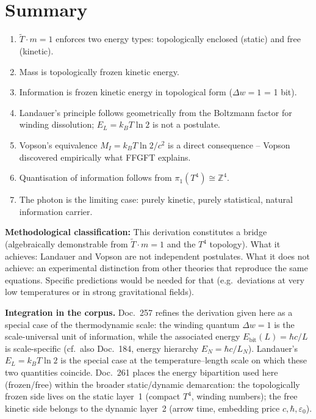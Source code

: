 \section{Summary}

\begin{enumerate}
  \item \(\tilde{T} \cdot m = 1\) enforces two energy types:
        topologically enclosed (static) and free (kinetic).
  \item Mass is topologically frozen kinetic energy.
  \item Information is frozen kinetic energy in topological form
        (\(\Delta w = 1\) = 1 bit).
  \item Landauer's principle follows geometrically from the
        Boltzmann factor for winding dissolution;
        \(E_L = k_BT\ln 2\) is not a postulate.
  \item Vopson's equivalence \(M_I = k_BT\ln2/c^2\) is a direct
        consequence -- Vopson discovered empirically what FFGFT explains.
  \item Quantisation of information follows from
        \(\pi_1(T^4)\cong\mathbb{Z}^4\).
  \item The photon is the limiting case: purely kinetic, purely
        statistical, natural information carrier.
\end{enumerate}

\bigskip
\noindent
\textbf{Methodological classification:}
This derivation constitutes a bridge (algebraically demonstrable
from \(\tilde{T}\cdot m=1\) and the \(T^4\) topology).
What it achieves: Landauer and Vopson are not independent postulates.
What it does not achieve: an experimental distinction from other theories
that reproduce the same equations.
Specific predictions would be needed for that (e.g.\ deviations at
very low temperatures or in strong gravitational fields).

\bigskip
\noindent
\textbf{Integration in the corpus.}
Doc.~257 refines the derivation given here as a special case of the
thermodynamic scale: the winding quantum \(\Delta w = 1\) is the
scale-universal unit of information, while the associated energy
\(E_\text{bit}(L) = \hbar c/L\) is scale-specific
(cf.\ also Doc.~184, energy hierarchy \(E_N = \hbar c/L_N\)).
Landauer's \(E_L = k_B T \ln 2\) is the special case at the
temperature--length scale on which these two quantities coincide.
Doc.~261 places the energy bipartition used here (frozen/free)
within the broader static/dynamic demarcation: the topologically
frozen side lives on the static layer~1 (compact \(T^4\), winding
numbers); the free kinetic side belongs to the dynamic layer~2
(arrow time, embedding price \(c,\hbar,\varepsilon_0\)).


